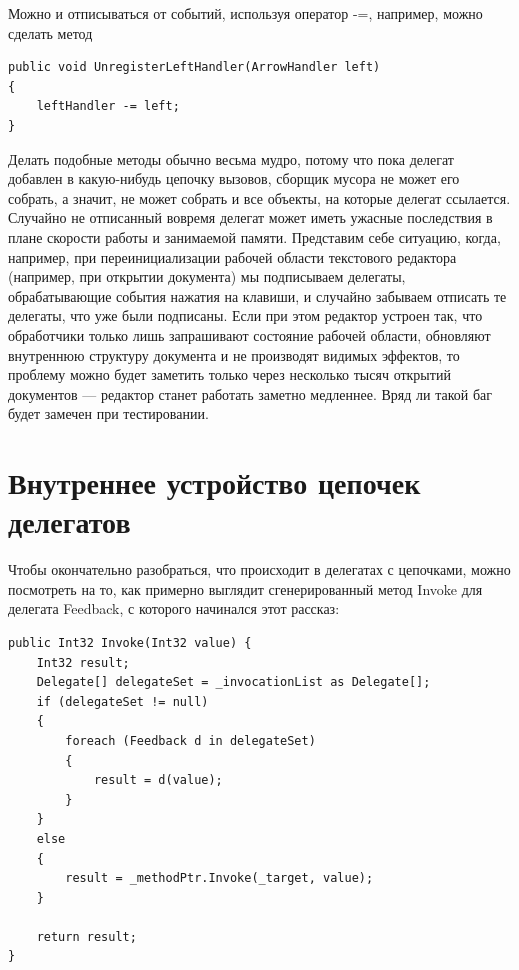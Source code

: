 \documentclass[a5paper]{article}
\begin{document}
Можно и отписываться от событий, используя оператор -=, например, можно сделать метод 

\begin{verbatim}
public void UnregisterLeftHandler(ArrowHandler left)
{
    leftHandler -= left;
}
\end{verbatim}

Делать подобные методы обычно весьма мудро, потому что пока делегат добавлен в какую-нибудь цепочку вызовов, сборщик мусора не может его собрать, а значит, не может собрать и все объекты, на которые делегат ссылается. Случайно не отписанный вовремя делегат может иметь ужасные последствия в плане скорости работы и занимаемой памяти. Представим себе ситуацию, когда, например, при переинициализации рабочей области текстового редактора (например, при открытии документа) мы подписываем делегаты, обрабатывающие события нажатия на клавиши, и случайно забываем отписать те делегаты, что уже были подписаны. Если при этом редактор устроен так, что обработчики только лишь запрашивают состояние рабочей области, обновляют внутреннюю структуру документа и не производят видимых эффектов, то проблему можно будет заметить только через несколько тысяч открытий документов --- редактор станет работать заметно медленнее. Вряд ли такой баг будет замечен при тестировании.

\section{Внутреннее устройство цепочек делегатов}

Чтобы окончательно разобраться, что происходит в делегатах с цепочками, можно посмотреть на то, как примерно выглядит сгенерированный метод Invoke для делегата Feedback, с которого начинался этот рассказ:

\begin{verbatim}
public Int32 Invoke(Int32 value) {
    Int32 result;
    Delegate[] delegateSet = _invocationList as Delegate[];
    if (delegateSet != null) 
    {
        foreach (Feedback d in delegateSet)
        {
            result = d(value);
        }
    } 
    else 
    {
        result = _methodPtr.Invoke(_target, value);
    }

    return result;
}
\end{verbatim}
\end{document}
